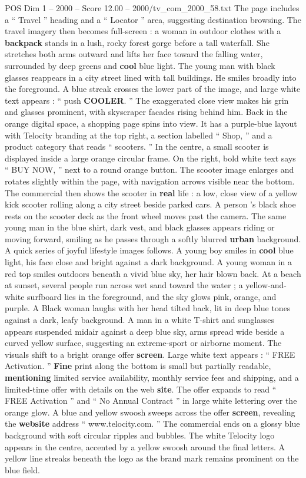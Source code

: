 \begin{textsample}{POS Dim 1 – 2000 – Score 12.00 – 2000/tv\_com\_2000\_58.txt}
The page includes a “ Travel ” heading and a “ Locator ” area, suggesting destination browsing.
The travel imagery then becomes full-screen : a woman in outdoor clothes with a \textbf{backpack} stands in a lush, rocky forest gorge before a tall waterfall.
She stretches both arms outward and lifts her face toward the falling water, surrounded by deep greens and \textbf{cool} blue light.
The young man with black glasses reappears in a city street lined with tall buildings.
He smiles broadly into the foreground.
A blue streak crosses the lower part of the image, and large white text appears : “ push \textbf{COOLER}. ” The exaggerated close view makes his grin and glasses prominent, with skyscraper facades rising behind him.
Back in the orange digital space, a shopping page spins into view.
It has a purple-blue layout with Telocity branding at the top right, a section labelled “ Shop, ” and a product category that reads “ scooters. ” In the centre, a small scooter is displayed inside a large orange circular frame.
On the right, bold white text says “ BUY NOW, ” next to a round orange button.
The scooter image enlarges and rotates slightly within the page, with navigation arrows visible near the bottom.
The commercial then shows the scooter in \textbf{real} life : a low, close view of a yellow kick scooter rolling along a city street beside parked cars.
A person ’s black shoe rests on the scooter deck as the front wheel moves past the camera.
The same young man in the blue shirt, dark vest, and black glasses appears riding or moving forward, smiling as he passes through a softly blurred \textbf{urban} background.
A quick series of joyful lifestyle images follows.
A young boy smiles in \textbf{cool} blue light, his face close and bright against a dark background.
A young woman in a red top smiles outdoors beneath a vivid blue sky, her hair blown back.
At a beach at sunset, several people run across wet sand toward the water ; a yellow-and-white surfboard lies in the foreground, and the sky glows pink, orange, and purple.
A Black woman laughs with her head tilted back, lit in deep blue tones against a dark, leafy background.
A man in a white T-shirt and sunglasses appears suspended midair against a deep blue sky, arms spread wide beside a curved yellow surface, suggesting an extreme-sport or airborne moment.
The visuals shift to a bright orange offer \textbf{screen}.
Large white text appears : “ FREE Activation. ” \textbf{Fine} print along the bottom is small but partially readable, \textbf{mentioning} limited service availability, monthly service fees and shipping, and a limited-time offer with details on the web \textbf{site}.
The offer expands to read “ FREE Activation ” and “ No Annual Contract ” in large white lettering over the orange glow.
A blue and yellow swoosh sweeps across the offer \textbf{screen}, revealing the \textbf{website} address “ www.telocity.com. ” The commercial ends on a glossy blue background with soft circular ripples and bubbles.
The white Telocity logo appears in the centre, accented by a yellow swoosh around the final letters.
A yellow line streaks beneath the logo as the brand mark remains prominent on the blue field.


\end{textsample}
